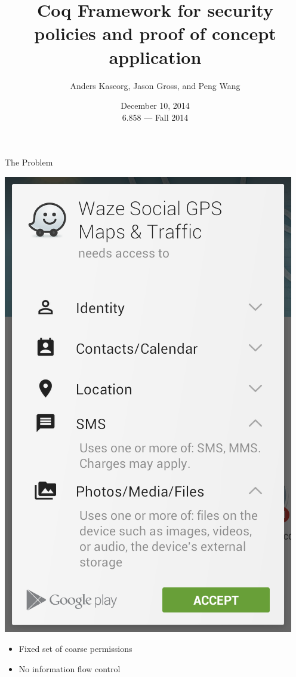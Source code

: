 \documentclass{beamer}
\begin{document}
\title{Coq Framework for security policies and proof of concept application}
\author{Anders Kaseorg, Jason Gross, and Peng Wang} 
\date{December 10, 2014 \\ 6.858 --- Fall 2014} 

\frame{\titlepage} 

\begin{frame}{\Huge The Problem}
\Large
\begin{multicols}{2}
\includegraphics[height=0.75\textheight]{waze}
\columnbreak
\begin{itemize}
  \item Fixed set of coarse permissions
  \item No information flow control
\end{itemize}
\end{multicols}
\end{frame}
\end{document}
